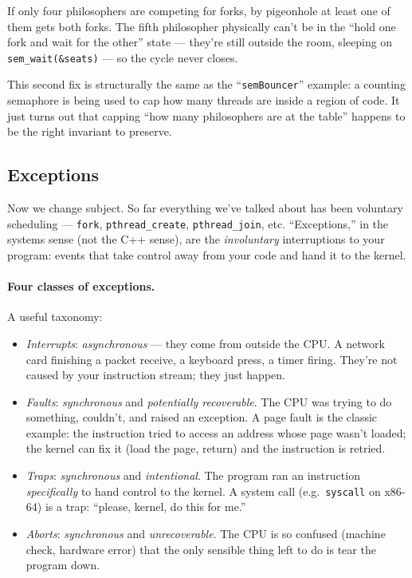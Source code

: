 \documentclass[11pt]{article}
\begin{document}
If only four philosophers are competing for forks, by pigeonhole at
least one of them gets both forks. The fifth philosopher physically
can't be in the ``hold one fork and wait for the other'' state ---
they're still outside the room, sleeping on
\texttt{sem\_wait(\&seats)} --- so the cycle never closes.

This second fix is structurally the same as the
``\texttt{semBouncer}'' example: a counting semaphore is being used to
cap how many threads are inside a region of code. It just turns out
that capping ``how many philosophers are at the table'' happens to be
the right invariant to preserve.

\subsection*{Exceptions}

Now we change subject. So far everything we've talked about has been
voluntary scheduling --- \texttt{fork}, \texttt{pthread\_create},
\texttt{pthread\_join}, etc.  ``Exceptions,'' in the systems sense
(not the C++ sense), are the \emph{involuntary} interruptions to your
program: events that take control away from your code and hand it to
the kernel.

\paragraph{Four classes of exceptions.} A useful taxonomy:
\begin{itemize}
  \item \emph{Interrupts}: \emph{asynchronous} --- they come from
    outside the CPU. A network card finishing a packet receive, a
    keyboard press, a timer firing. They're not caused by your
    instruction stream; they just happen.
  \item \emph{Faults}: \emph{synchronous} and \emph{potentially
    recoverable}. The CPU was trying to do something, couldn't, and
    raised an exception. A page fault is the classic example: the
    instruction tried to access an address whose page wasn't loaded;
    the kernel can fix it (load the page, return) and the instruction
    is retried.
  \item \emph{Traps}: \emph{synchronous} and \emph{intentional}. The
    program ran an instruction \emph{specifically} to hand control to
    the kernel. A system call (e.g.\ \texttt{syscall} on x86-64) is a
    trap: ``please, kernel, do this for me.''
  \item \emph{Aborts}: \emph{synchronous} and \emph{unrecoverable}.
    The CPU is so confused (machine check, hardware error) that the
    only sensible thing left to do is tear the program down.
\end{itemize}
\end{document}

